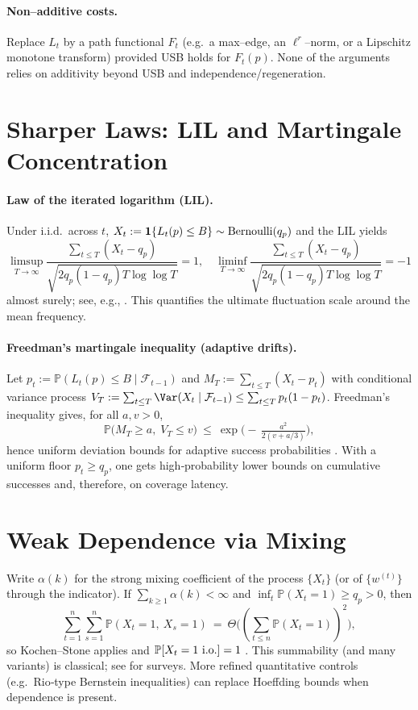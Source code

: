 \documentclass[11pt]{article}
\theoremstyle{plain}
\theoremstyle{definition}
\newcommand{\Prb}{\mathbb{P}}
\newcommand{\io}{\text{\rm i.o.}}
\begin{document}
\paragraph{Non–additive costs.}
Replace $L_t$ by a path functional $F_t$ (e.g.\ a max–edge, an $\ell^r$–norm, or a Lipschitz monotone transform) provided USB holds for $F_t(p)$. None of the arguments relies on additivity beyond USB and independence/regeneration.


\section{Sharper Laws: LIL and Martingale Concentration}
\paragraph{Law of the iterated logarithm (LIL).}
Under i.i.d.\ across $t$, $X_t:=\mathbf{1}\{L_t(p)\le B\}\sim{\rm Bernoulli}(q_p)$ and the LIL yields
\[
\limsup_{T\to\infty}\frac{\sum_{t\le T}(X_t-q_p)}{\sqrt{2q_p(1-q_p)T\log\log T}}=1,\quad
\liminf_{T\to\infty}\frac{\sum_{t\le T}(X_t-q_p)}{\sqrt{2q_p(1-q_p)T\log\log T}}=-1
\]
almost surely; see, e.g., \cite[Thm.~1.5.1]{Durrett}. This quantifies the ultimate fluctuation scale around the mean frequency.

\paragraph{Freedman’s martingale inequality (adaptive drifts).}
Let $p_t:=\Prb(L_t(p)\le B\mid\mathcal{F}_{t-1})$ and $M_T:=\sum_{t\le T}(X_t-p_t)$ with conditional variance process $V_T:=\sum_{t\le T}\Var(X_t\mid\mathcal{F}_{t-1})\le \sum_{t\le T}p_t(1-p_t)$. Freedman’s inequality gives, for all $a,v>0$,
\[
\Prb\!\Big(M_T\ge a,\; V_T\le v\Big)\ \le\ \exp\!\Big(\!-\,\tfrac{a^2}{2(v+a/3)}\Big),
\]
hence uniform deviation bounds for adaptive success probabilities \cite{Freedman1975}. With a uniform floor $p_t\ge q_p$, one gets high‑probability lower bounds on cumulative successes and, therefore, on coverage latency.

\section{Weak Dependence via Mixing}
Write $\alpha(k)$ for the strong mixing coefficient of the process $\{X_t\}$ (or of $\{w^{(t)}\}$ through the indicator). If $\sum_{k\ge 1}\alpha(k)<\infty$ and $\inf_t\Prb(X_t=1)\ge q_p>0$, then
\[
\sum_{t=1}^n\sum_{s=1}^n \Prb(X_t=1,\ X_s=1)\ =\ \Theta\!\big((\sum_{t\le n}\Prb(X_t=1))^2\big),
\]
so Kochen–Stone applies and $\Prb[X_t=1\ \io]=1$ \cite{KochenStone}. This summability (and many variants) is classical; see \cite{Doukhan1994,Bradley2005} for surveys. More refined quantitative controls (e.g.\ Rio‑type Bernstein inequalities) can replace Hoeffding bounds when dependence is present.
\end{document}
